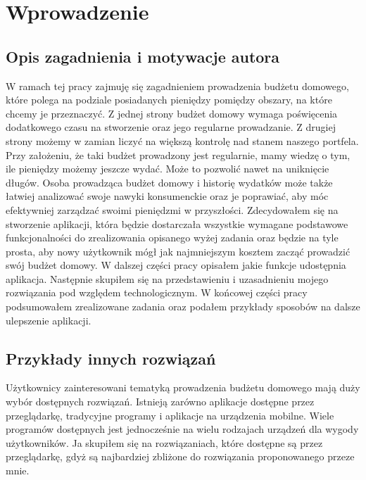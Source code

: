 \documentclass[shortabstract,inz]{iithesis}
\author         {Mateusz Kmita}
\begin{document}

\chapter{Wprowadzenie}
\section{Opis zagadnienia i motywacje autora}
W ramach tej pracy zajmuję się zagadnieniem prowadzenia budżetu domowego, które polega na podziale posiadanych pieniędzy pomiędzy obszary, na które chcemy je przeznaczyć. Z jednej strony budżet domowy wymaga poświęcenia dodatkowego czasu na stworzenie oraz jego regularne prowadzanie. Z drugiej strony możemy w zamian liczyć na większą kontrolę nad stanem naszego portfela. Przy założeniu, że taki budżet prowadzony jest regularnie, mamy wiedzę o tym, ile pieniędzy możemy jeszcze wydać. Może to pozwolić nawet na uniknięcie długów. Osoba prowadząca budżet domowy i historię wydatków może także łatwiej analizować swoje nawyki konsumenckie oraz je poprawiać, aby móc efektywniej zarządzać swoimi pieniędzmi w przyszłości.
\bigbreak
Zdecydowałem się na stworzenie aplikacji, która będzie dostarczała wszystkie wymagane podstawowe funkcjonalności do zrealizowania opisanego wyżej zadania oraz będzie na tyle prosta, aby nowy użytkownik mógł jak najmniejszym kosztem zacząć prowadzić swój budżet domowy. W dalszej części pracy opisałem jakie funkcje udostępnia aplikacja. Następnie skupiłem się na przedstawieniu i uzasadnieniu mojego rozwiązania pod względem technologicznym. W końcowej części pracy podsumowałem zrealizowane zadania oraz podałem przykłady sposobów na dalsze ulepszenie aplikacji.

\section{Przykłady innych rozwiązań}
Użytkownicy zainteresowani tematyką prowadzenia budżetu domowego mają duży wybór dostępnych rozwiązań. Istnieją zarówno aplikacje dostępne przez przeglądarkę, tradycyjne programy i aplikacje na urządzenia mobilne. Wiele programów dostępnych jest jednocześnie na wielu rodzajach urządzeń dla wygody użytkowników. Ja skupiłem się na rozwiązaniach, które dostępne są przez przeglądarkę, gdyż są najbardziej zbliżone do rozwiązania proponowanego przeze mnie.
\end{document}

